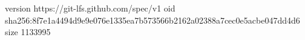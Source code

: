 version https://git-lfs.github.com/spec/v1
oid sha256:8f7e1a4494d9e9e076e1335ea7b573566b2162a02388a7cec0e5acbe047dd4d6
size 1133995
